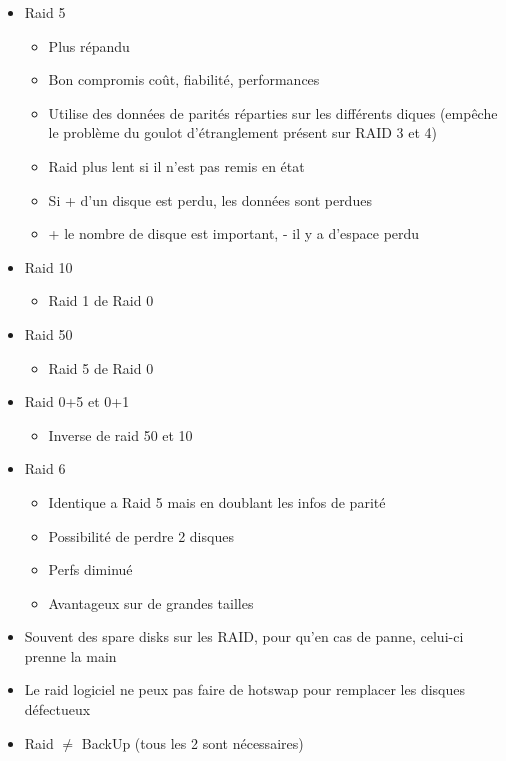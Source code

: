 \documentclass[a4paper]{article}
\begin{document}
\begin{itemize}[label=\textbullet, font=\Large]
\begin{itemize}[label=, font=\scriptsize]
        \end{itemize}
        \item Raid 5
        \begin{itemize}[label=, font=\scriptsize] 
          \item Plus répandu
          \item Bon compromis coût, fiabilité, performances
          \item Utilise des données de parités réparties sur les différents diques (empêche le problème du goulot d'étranglement présent sur RAID 3 et 4)
          \item Raid plus lent si il n'est pas remis en état
          \item Si + d'un disque est perdu, les données sont perdues
          \item + le nombre de disque est important, - il y a d'espace perdu
        \end{itemize}
        \item Raid 10
        \begin{itemize}[label=, font=\scriptsize] 
          \item Raid 1 de Raid 0
        \end{itemize}
        \item Raid 50
        \begin{itemize}[label=, font=\scriptsize] 
          \item Raid 5 de Raid 0
        \end{itemize}
        \item Raid 0+5 et 0+1
        \begin{itemize}[label=, font=\scriptsize] 
          \item Inverse de raid 50 et 10
        \end{itemize}
        \item Raid 6
        \begin{itemize}[label=, font=\scriptsize] 
          \item Identique a Raid 5 mais en doublant les infos de parité
          \item Possibilité de perdre 2 disques
          \item Perfs diminué
          \item Avantageux sur de grandes tailles
        \end{itemize}
        \item Souvent des spare disks sur les RAID, pour qu'en cas de panne, celui-ci prenne la main
        \item Le raid logiciel ne peux pas faire de hotswap pour remplacer les disques défectueux
        \item Raid $\ne$ BackUp (tous les 2 sont nécessaires)
      \end{itemize}
\end{document}
